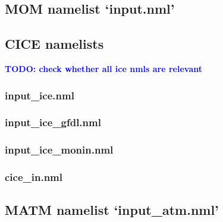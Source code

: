 \documentclass[11pt]{article}
\newcommand{\note}[1]{#1} %
\newcommand{\TODO}[1]{\note{\textcolor{blue}{\textsf{\textbf{TODO: #1}}}}}
\begin{document}
\subsection{MOM namelist `input.nml'}
\renewcommand{\nmllink}[2]{\href{https://github.com/mom-ocean/MOM5/search?q=#2}{#1}} %

\subsection{CICE namelists}
\renewcommand{\nmllink}[2]{\href{https://github.com/OceansAus/cice5/search?q=#2}{#1}} %
\TODO{check whether all ice nmls are relevant}
\subsubsection{input\_ice.nml}
\subsubsection{input\_ice\_gfdl.nml}
\subsubsection{input\_ice\_monin.nml}
\subsubsection{cice\_in.nml}

\subsection{MATM namelist `input\_atm.nml'}
\renewcommand{\nmllink}[2]{\href{https://github.com/OceansAus/matm/search?q=#2}{#1}} %



\end{document}
